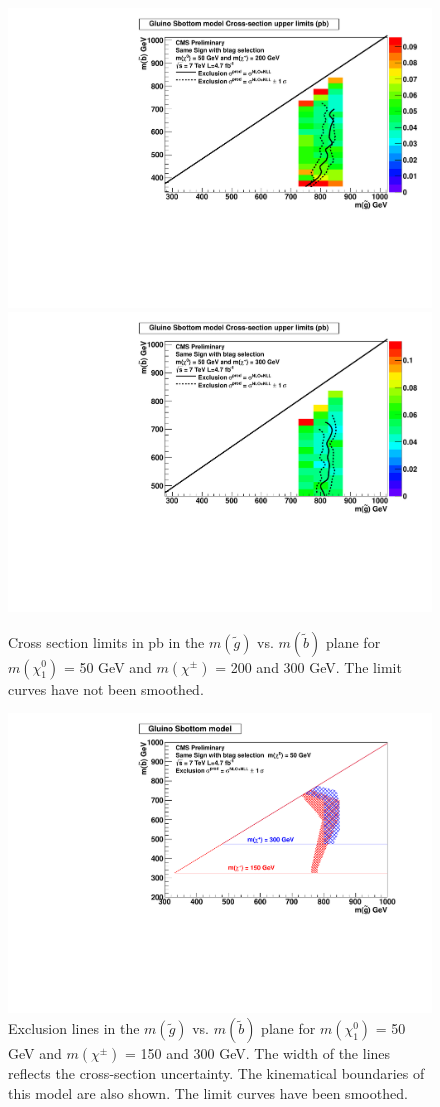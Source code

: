 \begin{figure}[htb]
\begin{center}
\includegraphics[width=0.49\linewidth]{figs/B2_LimitsOnCarpet_200.pdf}
\includegraphics[width=0.49\linewidth]{figs/B2_LimitsOnCarpet_300.pdf}
\caption{Cross section limits in pb in the $m(\widetilde{g})$ vs. 
$m(\widetilde{b})$ plane
for $m(\chi_1^0)$ = 50 GeV and 
$m(\chi^{\pm})$ = 200 and 300 GeV.
The limit curves have not been smoothed.
\label{fig:mglinoSbottom2}}
\end{center}
\end{figure}

\begin{figure}[htb]
\begin{center}
\includegraphics[width=0.49\linewidth]{figs/B2_CheeseWedge.pdf}
\caption{Exclusion lines in the $m(\widetilde{g})$ vs. 
$m(\widetilde{b})$ plane
for $m(\chi_1^0)$ = 50 GeV and 
$m(\chi^{\pm})$ = 150 and 300 GeV.  The width of the lines
reflects the cross-section uncertainty.  The kinematical boundaries
of this model are also shown.
The limit curves have been smoothed.
\label{fig:sbottom_cheese}}
\end{center}
\end{figure}




